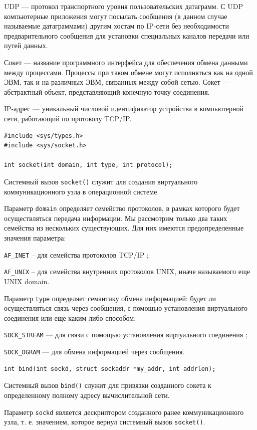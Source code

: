 \documentclass[a4paper,14pt]{extarticle}
\begin{document}
UDP --- протокол транспортного уровня пользовательских датаграмм. С UDP компьютерные приложения могут посылать сообщения (в данном случае называемые датаграммами) другим хостам по IP-сети без необходимости предварительного сообщения для установки специальных каналов передачи или путей данных. 

Сокет --- название программного интерфейса для обеспечения обмена данными между процессами. Процессы при таком обмене могут исполняться как на одной ЭВМ, так и на различных ЭВМ, связанных между собой сетью. Сокет --- абстрактный объект, представляющий конечную точку соединения.

IP-адрес --- уникальный числовой идентификатор устройства в компьютерной сети, работающий по протоколу TCP/IP.

\begin{verbatim}
#include <sys/types.h>
#include <sys/socket.h> 

int socket(int domain, int type, int protocol);
\end{verbatim}

Системный вызов \verb|socket()| служит для создания виртуального коммуникационного узла в операционной системе.

Параметр \verb|domain| определяет семейство протоколов, в рамках которого будет осуществляться передача информации. Мы рассмотрим только два таких семейства из нескольких существующих. Для них имеются предопределенные значения параметра:

\verb|AF_INET| – для семейства протоколов TCP/IP ;

\verb|AF_UNIX| – для семейства внутренних протоколов UNIX, иначе называемого еще UNIX domain.

Параметр \verb|type| определяет семантику обмена информацией: будет ли осуществляться связь через сообщения, с помощью установления виртуального соединения или еще каким-либо способом.

\verb|SOCK_STREAM| --- для связи с помощью установления виртуального соединения ;

\verb|SOCK_DGRAM| --- для обмена информацией через сообщения.

\begin{verbatim}
int bind(int sockd, struct sockaddr *my_addr, int addrlen);
\end{verbatim}

Системный вызов \verb|bind()| служит для привязки созданного сокета к определенному полному адресу вычислительной сети.

Параметр \verb|sockd| является дескриптором созданного ранее коммуникационного узла, т. е. значением, которое вернул системный вызов \verb|socket()|.
\end{document}

